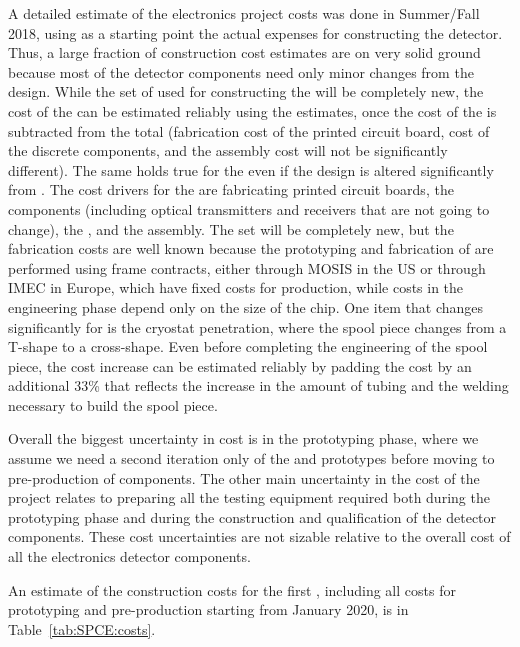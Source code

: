 A detailed estimate of the  electronics project costs was done in Summer/Fall 2018, using as a starting point
the actual expenses for constructing the 
detector. Thus, a large fraction of construction
cost estimates are on very solid ground because most of the detector components 
need only minor changes from the  design. While the
set of  used for constructing the 
will be completely new, the cost of the  can
be estimated reliably using the  estimates,
once the cost of the  is subtracted from the total
(fabrication cost of the printed circuit board,
cost of the discrete components, and the assembly cost
will not be significantly different). The same holds true
for the  even if the design is altered significantly
from .
The cost drivers for the  are fabricating
printed circuit boards, the components (including
optical transmitters and receivers that are not going to change),
the , and the assembly. The  set will
be completely new, but the fabrication costs are well
known because the prototyping and fabrication of
 are performed using frame contracts, either
through MOSIS in the US or through IMEC in Europe, which
have fixed costs for production, while costs in the engineering
phase depend only on the size of the chip. One item that
changes significantly for  is the cryostat penetration,
where the spool piece changes from a T-shape to a cross-shape.
Even before completing the engineering of the spool piece,
the cost increase can be estimated reliably by
padding the cost by an additional 33\% that reflects the increase
in the amount of tubing and the welding necessary to build
the spool piece. 

Overall the biggest uncertainty in cost is
in the prototyping phase, where we assume we need  a second
iteration only of the  and  prototypes
before moving to pre-production of 
components. The other main uncertainty in the cost of the
project relates to preparing all the testing
equipment required both during the prototyping phase and
during the construction and qualification of the detector
components. These cost uncertainties are not sizable 
relative to the overall cost of all the  electronics
detector components.

An estimate of the construction costs for the first 
 , including all costs for prototyping and
pre-production starting from January 2020, is in Table~\ref{tab:SPCE:costs}.

